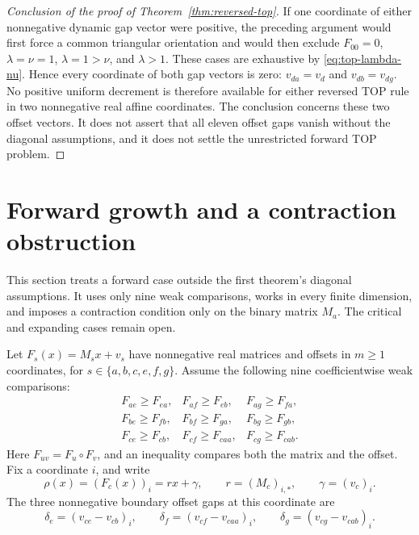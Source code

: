 \documentclass[11pt,a4paper]{article}
\begin{document}
\begin{proof}[Conclusion of the proof of Theorem~\ref{thm:reversed-top}]
If one coordinate of either nonnegative dynamic gap vector were
positive, the preceding argument would first force a common triangular
orientation and would then exclude $F_{00}=0$, $\lambda=\nu=1$,
$\lambda=1>\nu$, and $\lambda>1$. These cases are exhaustive by
\eqref{eq:top-lambda-nu}. Hence every coordinate of both gap vectors
is zero:
$v_{da}=v_d$ and $v_{db}=v_{dg}$.
No positive uniform decrement is therefore available for either
reversed TOP rule in two nonnegative real affine coordinates.
The conclusion concerns these two offset vectors. It does not assert
that all eleven offset gaps vanish without the diagonal assumptions,
and it does not settle the unrestricted forward TOP problem.
\end{proof}


\section{Forward growth and a contraction obstruction}
\label{sec:further-necessary}
\label{sec:forward-necessary}

This section treats a forward case outside the first theorem's diagonal
assumptions. It uses only nine weak comparisons, works in every finite
dimension, and imposes a contraction condition only on the binary
matrix $M_a$. The critical and expanding cases remain open.

Let $F_s(x)=M_sx+v_s$ have nonnegative real matrices and offsets in
$m\ge1$ coordinates, for $s\in\{a,b,c,e,f,g\}$. Assume the following
nine coefficientwise weak comparisons:
\begin{equation}\label{eq:forward-nine}
\begin{array}{lll}
 F_{ae}\ge F_{ea},&F_{af}\ge F_{eb},&F_{ag}\ge F_{fa},\\
 F_{be}\ge F_{fb},&F_{bf}\ge F_{ga},&F_{bg}\ge F_{gb},\\
 F_{ce}\ge F_{cb},&F_{cf}\ge F_{caa},&F_{cg}\ge F_{cab}.
\end{array}
\end{equation}
Here $F_{uv}=F_u\circ F_v$, and an inequality compares both the matrix
and the offset. Fix a coordinate $i$, and write
\[
 \rho(x)=(F_c(x))_i=r x+\gamma,
 \qquad r=(M_c)_{i,*},\qquad \gamma=(v_c)_i.
\]
The three nonnegative boundary offset gaps at this coordinate are
\begin{equation}\label{eq:forward-boundary-gaps}
 \delta_e=(v_{ce}-v_{cb})_i,\qquad
 \delta_f=(v_{cf}-v_{caa})_i,\qquad
 \delta_g=(v_{cg}-v_{cab})_i.
\end{equation}
\end{document}
